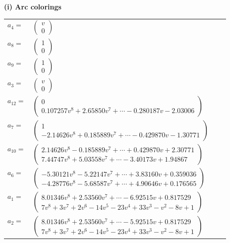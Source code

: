 \documentclass[1p]{elsarticle_modified}
\theoremstyle{definition}
\begin{document}
\flushleft \textbf{(i) Arc colorings}\\
\begin{tabular}{m{7pt} m{180pt} m{7pt} m{180pt} }
\flushright $a_{4}=$&$\begin{pmatrix}v\\0\end{pmatrix}$ \\
\flushright $a_{8}=$&$\begin{pmatrix}1\\0\end{pmatrix}$ \\
\flushright $a_{9}=$&$\begin{pmatrix}1\\0\end{pmatrix}$ \\
\flushright $a_{3}=$&$\begin{pmatrix}v\\0\end{pmatrix}$ \\
\flushright $a_{12}=$&$\begin{pmatrix}0\\0.107257 v^{8}+2.65850 v^{7}+\cdots-0.280187 v-2.03006\end{pmatrix}$ \\
\flushright $a_{7}=$&$\begin{pmatrix}1\\-2.14626 v^{8}+0.185889 v^{7}+\cdots-0.429870 v-1.30771\end{pmatrix}$ \\
\flushright $a_{10}=$&$\begin{pmatrix}2.14626 v^{8}-0.185889 v^{7}+\cdots+0.429870 v+2.30771\\7.44747 v^{8}+5.03558 v^{7}+\cdots-3.40173 v+1.94867\end{pmatrix}$ \\
\flushright $a_{6}=$&$\begin{pmatrix}-5.30121 v^{8}-5.22147 v^{7}+\cdots+3.83160 v+0.359036\\-4.28776 v^{8}-5.68587 v^{7}+\cdots+4.90646 v+0.176565\end{pmatrix}$ \\
\flushright $a_{1}=$&$\begin{pmatrix}8.01346 v^{8}+2.53560 v^{7}+\cdots-6.92515 v+0.817529\\7 v^8+3 v^7+2 v^6-14 v^5-23 v^4+33 v^3- v^2-8 v+1\end{pmatrix}$ \\
\flushright $a_{2}=$&$\begin{pmatrix}8.01346 v^{8}+2.53560 v^{7}+\cdots-5.92515 v+0.817529\\7 v^8+3 v^7+2 v^6-14 v^5-23 v^4+33 v^3- v^2-8 v+1\end{pmatrix}$ \\

\end{tabular}
\end{document}
